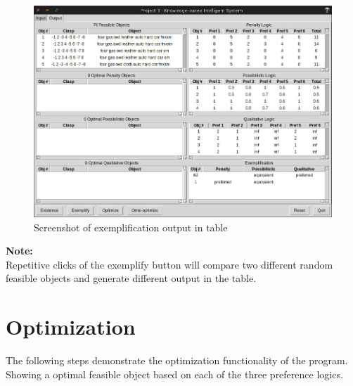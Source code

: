 \documentclass[12pt]{report}
\begin{document}
\begin{description}[leftmargin=4em]
\begin{figure}[H]
\begin{center}
\includegraphics[scale=0.3,trim=1cm 1cm 1cm 1cm]{post_exemplify}
\caption{Screenshot of exemplification output in table}
\end{center}
\end{figure}
\vspace{-2.5em}
\end{description}
\textbf{Note:} \\
Repetitive clicks of the exemplify button will compare two different random feasible objects and generate different output in the table.

\newpage
\section{Optimization}
The following steps demonstrate the optimization functionality of the program. \\
Showing a optimal feasible object based on each of the three preference logics.\\
\end{document}
